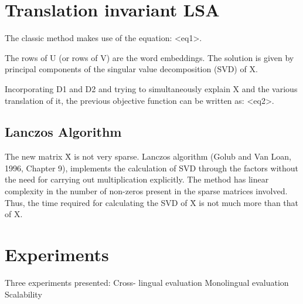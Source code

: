\documentclass[11pt]{article}
\begin{document}
\section{Translation invariant LSA}
The classic method makes use of the equation: <eq1>.

The rows of U (or rows of V) are the word embeddings.
The solution is given by principal components of the singular value decomposition (SVD) of X.

Incorporating D1 and D2 and trying to simultaneously explain X and the various translation of it, the previous objective function can be written as: <eq2>.

\subsection{Lanczos Algorithm}
The new matrix Ẋ is not very sparse.
Lanczos algorithm (Golub and Van Loan, 1996, Chapter 9), implements the calculation of SVD through the factors without the need for carrying out multiplication explicitly.
The method has linear complexity in the number of non-zeros present in the sparse matrices involved.
Thus, the time required for calculating the SVD of Ẋ is not much more than that of X.

\section{Experiments}
Three experiments presented:
Cross- lingual evaluation
Monolingual evaluation
Scalability





\end{document}
